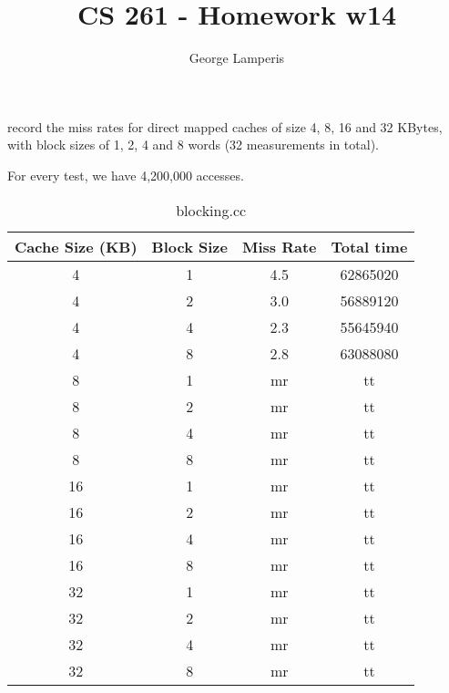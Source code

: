 \documentclass[letterpaper, 12pt, oneside]{memoir}
\title{CS 261 - Homework w14}
\author{George Lamperis}
\date{}
\begin{document}
\maketitle

record the miss rates for direct mapped caches of size 4, 8, 16 and 32 KBytes,
with block sizes of 1, 2, 4 and 8 words (32 measurements in total). 

For every test, we have 4,200,000 accesses.
\begin{table}[H]
\centering
\begin{tabular}{c|c|c|c}
    Cache Size (KB)  & Block Size & Miss Rate & Total time \\ \hline 
    4  & 1 & 4.5    & 62865020 \\
    4  & 2 & 3.0    & 56889120 \\
    4  & 4 & 2.3    & 55645940 \\
    4  & 8 &  2.8   & 63088080 \\ \hline
    8  & 1 & mr & tt \\
    8  & 2 & mr & tt \\
    8  & 4 & mr & tt \\
    8  & 8 & mr & tt \\ \hline
    16 & 1 & mr & tt \\
    16 & 2 & mr & tt \\
    16 & 4 & mr & tt \\
    16 & 8 & mr & tt \\ \hline
    32 & 1 & mr & tt \\
    32 & 2 & mr & tt \\
    32 & 4 & mr & tt \\
    32 & 8 & mr & tt \\
\end{tabular}
\caption{blocking.cc}
\end{table}
\end{document}
